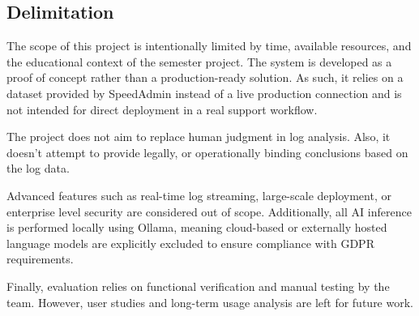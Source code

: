\subsection{Delimitation}
The scope of this project is intentionally limited by time, available resources, and the educational context of the semester project. The system is developed as a proof of concept rather than a production-ready solution. As such, it relies on a dataset provided by SpeedAdmin instead of a live production connection and is not intended for direct deployment in a real support workflow.

The project does not aim to replace human judgment in log analysis. Also, it doesn't attempt to provide legally, or operationally binding conclusions based on the log data.

Advanced features such as real-time log streaming, large-scale deployment, or enterprise level security are considered out of scope. Additionally, all AI inference is performed locally using Ollama, meaning cloud-based or externally hosted language models are explicitly excluded to ensure compliance with GDPR requirements.

Finally, evaluation relies on functional verification and manual testing by the team. However, user studies and long-term usage analysis are left for future work.
\pagebreak

